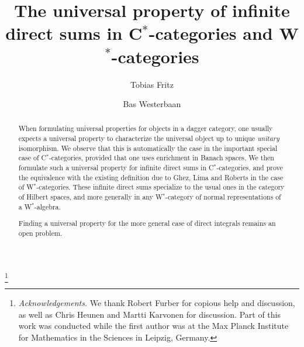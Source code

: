 \documentclass[reqno,T1,11pt]{amsproc}
\theoremstyle{plain}
\theoremstyle{remark}
\numberwithin{equation}{section}
\begin{document}
\sloppy

\setlength{\jot}{6pt}



\title[Infinite direct sums in C$^*$-categories and W$^*$-categories]{The universal property of infinite direct sums in C$^*$-categories and W$^*$-categories}

\author{Tobias Fritz}
\author{Bas Westerbaan}

\address{Perimeter Institute for Theoeretical Physics, Waterloo, Ontario, Canada}

\address{Department of Computer Science, University College London, United Kingdom}

\keywords{}


\thanks{\textit{Acknowledgements.} We thank Robert Furber for copious
help and discussion, as well as Chris Heunen and Martti Karvonen
for discussion. Part of this work was conducted while the first
author was at the Max Planck Institute for Mathematics in the
Sciences in Leipzig, Germany.}

\begin{abstract}
When formulating universal properties for objects in a dagger category, one usually expects a universal property to characterize the universal object up to unique \emph{unitary} isomorphism. We observe that this is automatically the case in the important special case of C$^*$-categories, provided that one uses enrichment in Banach spaces. We then formulate such a universal property for infinite direct sums in C$^*$-categories, and prove the equivalence with the existing definition due to Ghez, Lima and Roberts in the case of W$^*$-categories. These infinite direct sums specialize to the usual ones in the category of Hilbert spaces, and more generally in any W$^*$-category of normal representations of a W$^*$-algebra.

Finding a universal property for the more general case of direct integrals remains an open problem.
\end{abstract}

\maketitle
\end{document}
